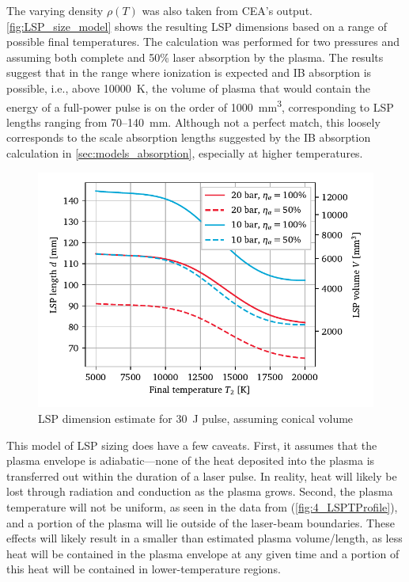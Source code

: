         The varying density $\rho(T)$ was also taken from CEA's output. \autoref{fig:LSP_size_model} shows the resulting LSP dimensions based on a range of possible final temperatures. The calculation was performed for two pressures and assuming both complete and 50\% laser absorption by the plasma. The results suggest that in the range where ionization is expected and IB absorption is possible, i.e., above \qty{10000}{K}, the volume of plasma that would contain the energy of a full-power pulse is on the order of 1000~\unit{mm^3}, corresponding to LSP lengths ranging from 70--\qty{140}{mm}. Although not a perfect match, this loosely corresponds to the scale absorption lengths suggested by the IB absorption calculation in \autoref{sec:models_absorption}, especially at higher temperatures.

        \begin{figure}[h]
            \centering
            \includegraphics[]{assets/4 models/volume_est.pdf}
            \caption{LSP dimension estimate for \qty{30}{J} pulse, assuming conical volume}
            \label{fig:LSP_size_model}
        \end{figure}

        This model of LSP sizing does have a few caveats. First, it assumes that the plasma envelope is adiabatic---none of the heat deposited into the plasma is transferred out within the duration of a laser pulse. In reality, heat will likely be lost through radiation and conduction as the plasma grows. Second, the plasma temperature will not be uniform, as seen in the data from \textcite{welleEnergyConversionEfficiency1986} (\autoref{fig:4_LSPTProfile}), and a portion of the plasma will lie outside of the laser-beam boundaries. These effects will likely result in a smaller than estimated plasma volume/length, as less heat will be contained in the plasma envelope at any given time and a portion of this heat will be contained in lower-temperature regions.

